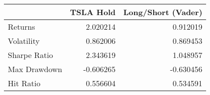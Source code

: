 \begin{tabular}{lrr}
\toprule
{} &  TSLA Hold &  Long/Short (Vader) \\
\midrule
Returns      &   2.020214 &            0.912019 \\
Volatility   &   0.862006 &            0.869453 \\
Sharpe Ratio &   2.343619 &            1.048957 \\
Max Drawdown &  -0.606265 &           -0.630456 \\
Hit Ratio    &   0.556604 &            0.534591 \\
\bottomrule
\end{tabular}
